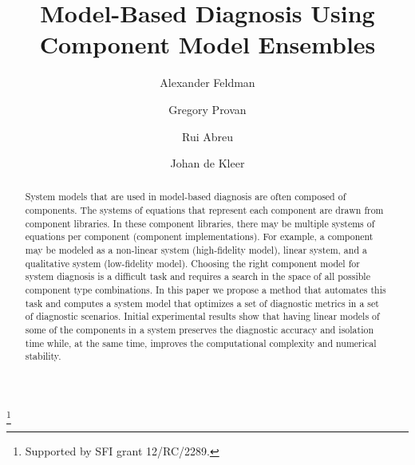\documentclass{ifacconf}
\begin{document}
%
\begin{frontmatter}
%
\title{Model-Based Diagnosis Using Component Model Ensembles}
%
\thanks[footnoteinfo]{Supported by SFI grant 12/RC/2289.}
%
\author[First]{Alexander Feldman}
\author[Second]{Gregory Provan}
\author[First]{Rui Abreu}
\author[First]{Johan de Kleer}
%
\address[First]{PARC Inc., Palo Alto, CA 94304, USA\\(e-mail: \{afeldman,dekleer,rui\}@parc.com)}
\address[Second]{Department of Computer Science, University College Cork, Cork, Ireland (e-mail: g.provan@cs.ucc.ie).}
%
\begin{abstract}
%
System models that are used in model-based diagnosis are often
composed of components. The systems of equations that represent each
component are drawn from component libraries. In these component
libraries, there may be multiple systems of equations per component
(component implementations). For example, a component may be modeled
as a non-linear system (high-fidelity model), linear system, and a
qualitative system (low-fidelity model). Choosing the right component
model for system diagnosis is a difficult task and requires a search
in the space of all possible component type combinations. In this
paper we propose a method that automates this task and computes a
system model that optimizes a set of diagnostic metrics in a set of
diagnostic scenarios. Initial experimental results show that having
linear models of some of the components in a system preserves the
diagnostic accuracy and isolation time while, at the same time,
improves the computational complexity and numerical stability.
%
\end{abstract}
\end{frontmatter}
%






%

%
\end{document}
